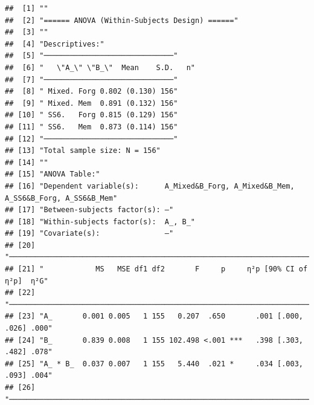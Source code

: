 \documentclass[
  man]{apa6}
\begin{document}
\begin{verbatim}
##  [1] ""                                                                                       
##  [2] "====== ANOVA (Within-Subjects Design) ======"                                           
##  [3] ""                                                                                       
##  [4] "Descriptives:"                                                                          
##  [5] "──────────────────────────────"                                                         
##  [6] "   \"A_\" \"B_\"  Mean    S.D.   n"                                                     
##  [7] "──────────────────────────────"                                                         
##  [8] " Mixed. Forg 0.802 (0.130) 156"                                                         
##  [9] " Mixed. Mem  0.891 (0.132) 156"                                                         
## [10] " SS6.   Forg 0.815 (0.129) 156"                                                         
## [11] " SS6.   Mem  0.873 (0.114) 156"                                                         
## [12] "──────────────────────────────"                                                         
## [13] "Total sample size: N = 156"                                                             
## [14] ""                                                                                       
## [15] "ANOVA Table:"                                                                           
## [16] "Dependent variable(s):      A_Mixed&B_Forg, A_Mixed&B_Mem, A_SS6&B_Forg, A_SS6&B_Mem"   
## [17] "Between-subjects factor(s): –"                                                          
## [18] "Within-subjects factor(s):  A_, B_"                                                     
## [19] "Covariate(s):               –"                                                          
## [20] "───────────────────────────────────────────────────────────────────────"                
## [21] "            MS   MSE df1 df2       F     p     η²p [90% CI of η²p]  η²G"                
## [22] "───────────────────────────────────────────────────────────────────────"                
## [23] "A_       0.001 0.005   1 155   0.207  .650       .001 [.000, .026] .000"                
## [24] "B_       0.839 0.008   1 155 102.498 <.001 ***   .398 [.303, .482] .078"                
## [25] "A_ * B_  0.037 0.007   1 155   5.440  .021 *     .034 [.003, .093] .004"                
## [26] "───────────────────────────────────────────────────────────────────────"                

\end{verbatim}
\end{document}
